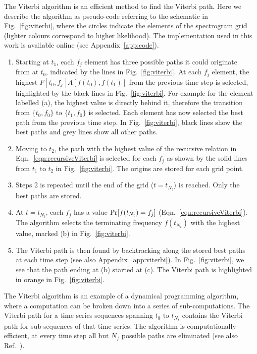 \documentclass[paper-main.tex]{subfiles}
\begin{document}
The Viterbi algorithm is an efficient method to find the Viterbi path. 
Here we describe the algorithm as pseudo-code referring to the schematic in Fig.~\ref{fig:viterbi}, where the circles indicate the elements of the spectrogram grid (lighter colours correspond to higher likelihood). 
The implementation used in this work is available online (see Appendix~\ref{app:code}).
\begin{enumerate}
\item Starting at $t_1$, each $f_j$ element has three possible paths it could originate from at $t_0$, indicated by the lines in Fig.~\ref{fig:viterbi}. 
At each $f_j$ element, the highest $F[t_0,f_j] A[f(t_0),f(t_1)]$ from the previous time step is selected, highlighted by the black lines in Fig.~\ref{fig:viterbi}. 
For example for the element labelled (a), the highest value is directly behind it, therefore the transition from $\{t_0,f_0\}$ to $\{t_1,f_0\}$ is selected. 
Each element has now selected the best path from the previous time step. 
In Fig.~\ref{fig:viterbi}, black lines show the best paths and grey lines show all other paths. 

\item Moving to $t_2$, the path with the highest value of the recursive relation in Eqn.~\ref{eqn:recursiveViterbi} is selected for each $f_j$ as shown by the solid lines from $t_1$ to $t_2$ in Fig.~\ref{fig:viterbi}. 
The origins are stored for each grid point.

\item Steps 2 is repeated until the end of the grid ($t=t_{N_t}$) is reached. 
Only the best paths are stored. 

\item At $t=t_{N_t}$, each $f_j$ has a value ${\rm Pr}[f(t_{N_t})=f_j]$ (Eqn.~\ref{eqn:recursiveViterbi}). 
The algorithm selects the terminating frequency $f(t_{N_t})$ with the highest value, marked (b) in Fig.~\ref{fig:viterbi}.

\item The Viterbi path is then found by backtracking along the stored best paths at each time step (see also Appendix~\ref{app:viterbi}). 
In Fig.~\ref{fig:viterbi}, we see that the path ending at (b) started at (c). 
The Viterbi path is highlighted in orange in Fig.~\ref{fig:viterbi}.
\end{enumerate}
The Viterbi algorithm is an example of a dynamical programming algorithm, where a computation can be broken down into a series of sub-computations.
The Viterbi path for a time series sequences spanning $t_0$ to $t_{N_t}$ contains the Viterbi path for sub-sequences of that time series. 
The algorithm is computationally efficient, at every time step all but $N_f$ possible paths are eliminated (see also Ref.~\cite{ScoX1ViterbiO1:2017}).
\end{document}
